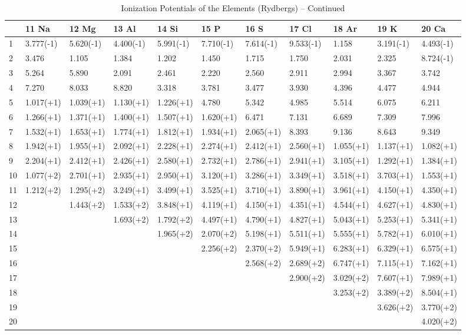 \begin{table}
\begin{center}
\addtocounter{table}{-1}
\scriptsize
\caption{Ionization Potentials of the Elements (Rydbergs) -- Continued}
\begin{tabular}{lllllllllll}
\hline
&11 Na& 12 Mg& 13 Al& 14 Si& 15 P&16 S& 17 Cl& 18 Ar& 19 K& 20 Ca\\
\hline
1&
3.777(-1)&5.620(-1)&4.400(-1)&5.991(-1)&7.710(-1)&7.614(-1)&9.533(-1)&1.158&
3.191(-1)&4.493(-1)\\
2& 3.476& 1.105& 1.384& 1.202& 1.450& 1.715& 1.750& 2.031& 2.325&
8.724(-1)\\
3& 5.264& 5.890& 2.091& 2.461& 2.220& 2.560& 2.911& 2.994& 3.367& 3.742\\
4& 7.270&
8.033& 8.820& 3.318& 3.781& 3.477& 3.930& 4.396& 4.477& 4.944\\
5& 1.017(+1)& 1.039(+1)& 1.130(+1)& 1.226(+1)& 4.780& 5.342& 4.985& 5.514&
6.075& 6.211\\
6& 1.266(+1)& 1.371(+1)& 1.400(+1)& 1.507(+1)& 1.620(+1)& 6.471& 7.131&
6.689& 7.309& 7.996\\
7& 1.532(+1)& 1.653(+1)& 1.774(+1)& 1.812(+1)& 1.934(+1)& 2.065(+1)& 8.393&
9.136& 8.643&
9.349\\
8& 1.942(+1)& 1.955(+1)& 2.092(+1)& 2.228(+1)& 2.274(+1)& 2.412(+1)&
2.560(+1)& 1.055(+1)& 1.137(+1)& 1.082(+1)\\
9& 2.204(+1)& 2.412(+1)& 2.426(+1)& 2.580(+1)& 2.732(+1)& 2.786(+1)&
2.941(+1)& 3.105(+1)& 1.292(+1)& 1.384(+1)\\
10& 1.077(+2)& 2.701(+1)& 2.935(+1)& 2.950(+1)& 3.120(+1)& 3.286(+1)&
3.349(+1)& 3.518(+1)& 3.703(+1)& 1.553(+1)\\
11& 1.212(+2)& 1.295(+2)& 3.249(+1)& 3.499(+1)& 3.525(+1)& 3.710(+1)&
3.890(+1)& 3.961(+1)& 4.150(+1)& 4.350(+1)\\
12&& 1.443(+2)& 1.533(+2)& 3.848(+1)& 4.119(+1)& 4.150(+1)& 4.351(+1)&
4.544(+1)& 4.627(+1)& 4.830(+1)\\
13&&&  1.693(+2)& 1.792(+2)& 4.497(+1)& 4.790(+1)& 4.827(+1)& 5.043(+1)&
5.253(+1)& 5.341(+1)\\
14&&&& 1.965(+2)& 2.070(+2)& 5.198(+1)& 5.511(+1)& 5.555(+1)& 5.782(+1)&
6.010(+1)\\
15&&&&& 2.256(+2)& 2.370(+2)& 5.949(+1)& 6.283(+1)& 6.329(+1)& 6.575(+1)\\
16&&&&&& 2.568(+2)& 2.689(+2)& 6.747(+1)& 7.115(+1)& 7.162(+1)\\
17&&&&&&& 2.900(+2)& 3.029(+2)& 7.607(+1)& 7.989(+1)\\
18&&&&&&&& 3.253(+2)& 3.389(+2)& 8.504(+1)\\
19&&&&&&&&& 3.626(+2)& 3.770(+2)\\
20&&&&&&&&&& 4.020(+2)\\
\hline
\end{tabular}
\end{center}
\end{table}

